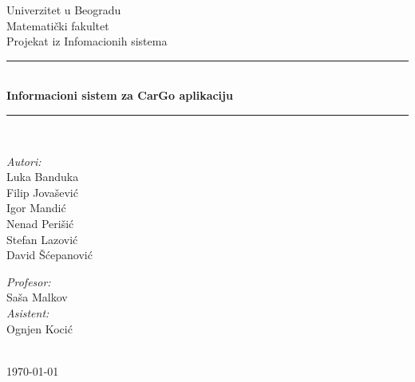 \begin{titlepage}


\newcommand{\HRule}{\rule{\linewidth}{0.5mm}}
\center
\textup{\Large Univerzitet u Beogradu\\Matemati\v cki fakultet}\\[1.5cm]
\textup{\Large Projekat iz Infomacionih sistema}\\[0.4cm]

\HRule \\[0.4cm]
{ \huge \bfseries Informacioni sistem za CarGo aplikaciju}\\[0.4cm]
\HRule \\[8.5cm]

\begin{minipage}{0.4\textwidth}
\begin{flushleft}
\large
\emph{Autori:}\\
\textup Luka Banduka\\
\textup Filip Jova\v sevi\' c\\
\textup Igor Mandi\' c\\
\textup Nenad Peri\v si\' c\\
\textup Stefan Lazovi\' c\\
\textup David \v S\' cepanovi\' c

\end{flushleft}
\end{minipage}
\hfill
\begin{minipage}{0.4\textwidth}
\begin{flushright}
\large
\emph{Profesor:} \\
\textup Sa\v sa Malkov\\
\emph{Asistent:} \\
\textup Ognjen Kocić\\
\end{flushright}
\end{minipage}\\[2cm]


{\textup \large \today}\\[1cm]

\end{titlepage}
